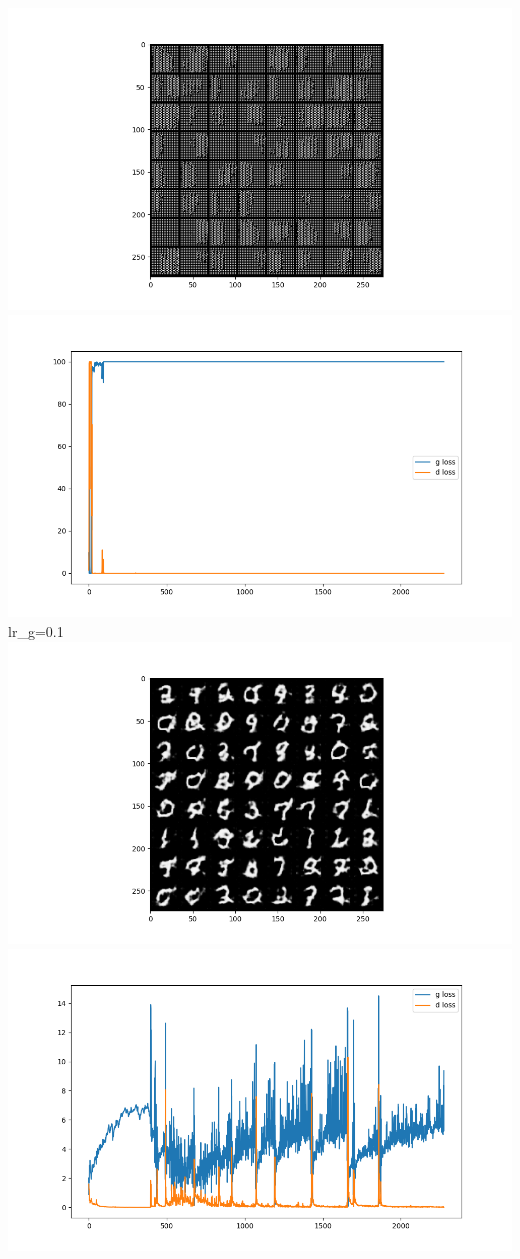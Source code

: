 \includegraphics{./images/Pasted image 20231228115037.png}\includegraphics{./images/Pasted image 20231228115222.png}
lr\_g=0.1
\includegraphics{./images/Pasted image 20231228115148.png}\includegraphics{./images/Pasted image 20231228115206.png}

